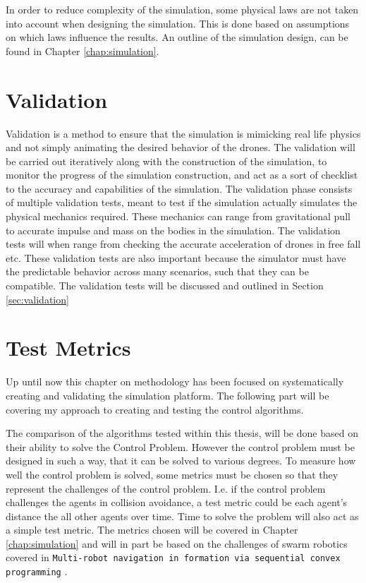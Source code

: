 In order to reduce complexity of the simulation, some physical laws are not taken into account when designing the simulation. This is done based on assumptions on which laws influence the results. An outline of the simulation design, can be found in Chapter \ref{chap:simulation}. 

\section{Validation}
Validation is a method to ensure that the simulation is mimicking real life physics and not simply animating the desired behavior of the drones. The validation will be carried out iteratively along with the construction of the simulation, to monitor the progress of the simulation construction, and act as a sort of checklist to the accuracy and capabilities of the simulation. The validation phase consists of multiple validation tests, meant to test if the simulation actually simulates the physical mechanics required. These mechanics can range from gravitational pull to accurate impulse and mass on the bodies in the simulation. The validation tests will when range from checking the accurate acceleration of drones in free fall etc. These validation tests are also important because the simulator must have the predictable behavior across many scenarios, such that they can be compatible. The validation tests will be discussed and outlined in Section \ref{sec:validation}

\section{Test Metrics}
Up until now this chapter on methodology has been focused on systematically creating and validating the simulation platform. The following part will be covering my approach to creating and testing the control algorithms. 

The comparison of the algorithms tested within this thesis, will be done based on their ability to solve the Control Problem. However the control problem must be designed in such a way, that it can be solved to various degrees. To measure how well the control problem is solved, some metrics must be chosen so that they represent the challenges of the control problem. I.e. if the control problem challenges the agents in collision avoidance, a test metric could be each agent's distance the all other agents over time. Time to solve the problem will also act as a simple test metric. The metrics chosen will be covered in Chapter \ref{chap:simulation} and will in part be based on the challenges of swarm robotics covered in \texttt{Multi-robot navigation in formation via sequential convex programming} \cite{alonso-mora_multi-robot_2015}.

